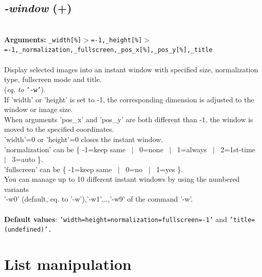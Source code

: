 \documentclass[a4paper,11pt,twoside]{book}
\begin{document}
\subsection{\emph{-window} (+)}\vspace*{-0.5em}
~\\\textbf{Arguments: } 
{\small \texttt{\_width[\%]$>$=-1,\_height[\%]$>$=-1,\_normalization,\_fullscreen,\_pos\_x[\%],\_pos\_y[\%],\_title}}\\~\\
Display selected images into an instant window with specified size, normalization type,
fullscreen mode and title.
~\\(\emph{eq. to} {\small \texttt{'-w'}}).
~\\If 'width' or 'height' is set to -1, the corresponding dimension is adjusted to the window
or image size.
~\\When arguments 'pos\_x' and 'pos\_y' are both different than -1, the window is moved to
the specified coordinates.
~\\'width'=0 or 'height'=0 closes the instant window.
~\\'normalization' can be \{ -1=keep same ~$|$~ 0=none ~$|$~ 1=always ~$|$~ 2=1st-time ~$|$~ 3=auto \}.
~\\'fullscreen' can be \{ -1=keep same ~$|$~ 0=no ~$|$~ 1=yes \}.
~\\You can manage up to 10 different instant windows by using the numbered variants
~\\'-w0' (default, eq. to '-w'),'-w1',..,'-w9' of the command '-w'.
~\\~\\\textbf{Default values}: {\small \texttt{'width=height=normalization=fullscreen=-1'} and \texttt{'title=(undefined)'.}}

\section{List manipulation}
\end{document}
